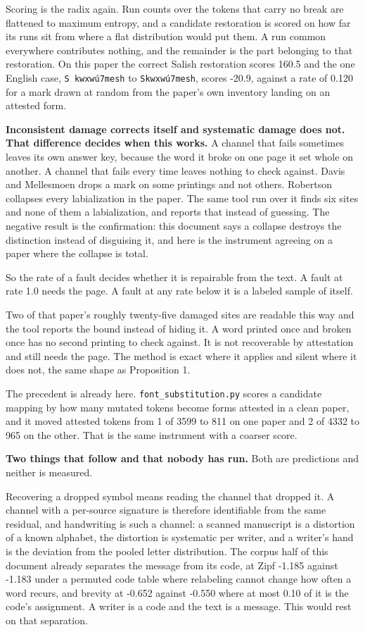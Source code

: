 Scoring is the radix again. Run counts over the tokens that carry no break are flattened to maximum entropy, and a candidate restoration is scored on how far its runs sit from where a flat distribution would put them. A run common everywhere contributes nothing, and the remainder is the part belonging to that restoration. On this paper the correct Salish restoration scores 160.5 and the one English case, \texttt{S kwxwú7mesh} to \texttt{Skwxwú7mesh}, scores -20.9, against a rate of 0.120 for a mark drawn at random from the paper's own inventory landing on an attested form.

\textbf{Inconsistent damage corrects itself and systematic damage does not. That difference decides when this works.} A channel that fails sometimes leaves its own answer key, because the word it broke on one page it set whole on another. A channel that fails every time leaves nothing to check against. Davis and Mellesmoen drops a mark on some printings and not others. Robertson collapses every labialization in the paper. The same tool run over it finds six sites and none of them a labialization, and reports that instead of guessing. The negative result is the confirmation: this document says a collapse destroys the distinction instead of disguising it, and here is the instrument agreeing on a paper where the collapse is total.

So the rate of a fault decides whether it is repairable from the text. A fault at rate 1.0 needs the page. A fault at any rate below it is a labeled sample of itself.

Two of that paper's roughly twenty-five damaged sites are readable this way and the tool reports the bound instead of hiding it. A word printed once and broken once has no second printing to check against. It is not recoverable by attestation and still needs the page. The method is exact where it applies and silent where it does not, the same shape as Proposition 1.

The precedent is already here. \texttt{font\_\allowbreak{}substitution.\allowbreak{}py} scores a candidate mapping by how many mutated tokens become forms attested in a clean paper, and it moved attested tokens from 1 of 3599 to 811 on one paper and 2 of 4332 to 965 on the other. That is the same instrument with a coarser score.

\textbf{Two things that follow and that nobody has run.} Both are predictions and neither is measured.

Recovering a dropped symbol means reading the channel that dropped it. A channel with a per-source signature is therefore identifiable from the same residual, and handwriting is such a channel: a scanned manuscript is a distortion of a known alphabet, the distortion is systematic per writer, and a writer's hand is the deviation from the pooled letter distribution. The corpus half of this document already separates the message from its code, at Zipf -1.185 against -1.183 under a permuted code table where relabeling cannot change how often a word recurs, and brevity at -0.652 against -0.550 where at most 0.10 of it is the code's assignment. A writer is a code and the text is a message. This would rest on that separation.


